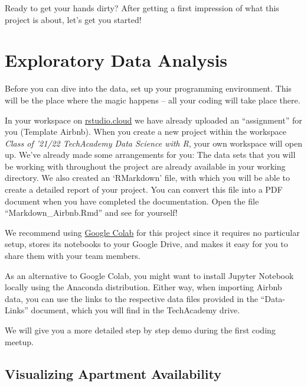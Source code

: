 \documentclass[
  11pt,
]{article}
\newenvironment{tips}[1]
  {
  \begin{itemize}
  \footnotesize
  \renewcommand{\labelitemi}{
    \raisebox{-.7\height}[0pt][0pt]{
      {\setkeys{Gin}{width=3em,keepaspectratio}
        \texttt{[image: images/\#1.png]}}
    }
  }
  \setlength{\fboxsep}{1em}
  \begin{rbox}
  \item
  }
  {
  \end{rbox}
  \end{itemize}
  }
\newenvironment{tipsp}[1]
  {
  \begin{itemize}
  \footnotesize
  \renewcommand{\labelitemi}{
    \raisebox{-.7\height}[0pt][0pt]{
      {\setkeys{Gin}{width=3em,keepaspectratio}
        \texttt{[image: images/\#1.png]}}
    }
  }
  \setlength{\fboxsep}{1em}
  \begin{pbox}
  \item
  }
  {
  \end{pbox}
  \end{itemize}
  }
\begin{document}
Ready to get your hands dirty? After getting a first impression of what this project is about, let's get you started!

\newpage

\hypertarget{exploratory-data-analysis}{%
\section{Exploratory Data Analysis}\label{exploratory-data-analysis}}

Before you can dive into the data, set up your programming environment. This will be the place where the magic happens -- all your coding will take place there.

\begin{tips}r
In your workspace on \href{https://rstudio.cloud/projects}{rstudio.cloud} we have already uploaded an ``assignment'' for you (Template Airbnb). When you create a new project within the workspace \emph{Class of '21/22 \textbar{} TechAcademy \textbar{} Data Science with R}, your own workspace will open up. We've already made some arrangements for you: The data sets that you will be working with throughout the project are already available in your working directory. We also created an `RMarkdown' file, with which you will be able to create a detailed report of your project. You can convert this file into a PDF document when you have completed the documentation. Open the file ``Markdown\_Airbnb.Rmd'' and see for yourself!

\end{tips}

\begin{tipsp}p
We recommend using \href{https://colab.research.google.com}{Google Colab} for this project since it requires no particular setup, stores its notebooks to your Google Drive, and makes it easy for you to share them with your team members.

As an alternative to Google Colab, you might want to install Jupyter Notebook locally using the Anaconda distribution.
Either way, when importing Airbnb data, you can use the links to the respective data files provided in the ``Data-Links'' document, which you will find in the TechAcademy drive.

We will give you a more detailed step by step demo during the first coding meetup.

\end{tipsp}

\hypertarget{visualizing-apartment-availability}{%
\subsection{Visualizing Apartment Availability}\label{visualizing-apartment-availability}}
\end{document}
